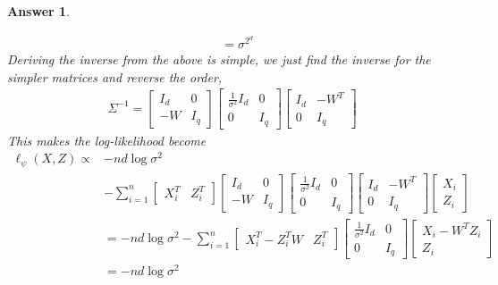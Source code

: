 \documentclass[12pt]{article}
\theoremstyle{colon}
\newtheorem*{answer}{Answer}
\begin{document}
\begin{answer}
\begin{enumerate}[label=\arabic*)]
\begin{align*}
        &= \sigma^{2^d}
      \end{align*}
      Deriving the inverse from the above is simple, we just find the inverse for the simpler matrices and reverse the order,
      \begin{gather*}
        \Sigma^{-1} = \begin{bmatrix} I_d & 0 \\ -W & I_q \end{bmatrix} \begin{bmatrix} \frac{1}{\sigma^2} I_d & 0 \\ 0 & I_q \end{bmatrix} \begin{bmatrix} I_d & -W^T \\ 0 & I_q \end{bmatrix}
      \end{gather*}
      This makes the log-likelihood become
      \begin{align*}
        \ell_{\psi} (X, Z) \propto &- n d \log \sigma^2 \\
        &- \sum_{i=1}^n \begin{bmatrix} X_i^T & Z_i^T \end{bmatrix} \begin{bmatrix} I_d & 0 \\ -W & I_q \end{bmatrix} \begin{bmatrix} \frac{1}{\sigma^2} I_d & 0 \\ 0 & I_q \end{bmatrix} \begin{bmatrix} I_d & -W^T \\ 0 & I_q \end{bmatrix} \begin{bmatrix} X_i \\ Z_i \end{bmatrix} \\
        &= - n d \log \sigma^2 - \sum_{i=1}^n \begin{bmatrix} X_i^T - Z_i^T W & Z_i^T \end{bmatrix} \begin{bmatrix} \frac{1}{\sigma^2} I_d & 0 \\ 0 & I_q \end{bmatrix} \begin{bmatrix} X_i - W^T Z_i \\ Z_i \end{bmatrix} \\
        &= -n d \log \sigma^2 \\

\end{align*}
\end{enumerate}
\end{answer}
\end{document}
